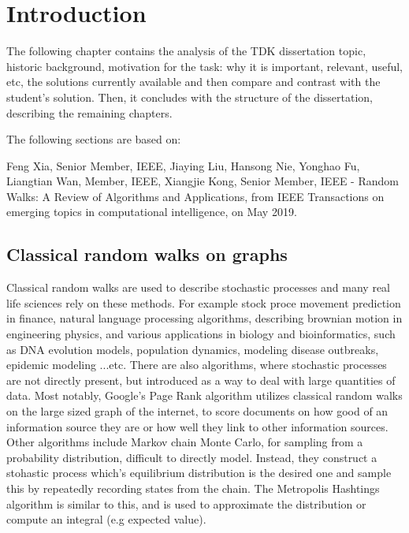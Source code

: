 \chapter{Introduction}

The following chapter contains the analysis of the TDK dissertation topic, historic background, motivation for the task: why it is important, relevant, useful, etc, the solutions currently available and then compare and contrast with the student's solution. Then, it concludes with the structure of the dissertation, describing the remaining chapters.

The following sections are based on:

Feng Xia, Senior Member, IEEE, Jiaying Liu, Hansong Nie, Yonghao Fu, Liangtian Wan, Member, IEEE,
Xiangjie Kong, Senior Member, IEEE - Random Walks: A Review of Algorithms and Applications, from IEEE Transactions on emerging topics in computational intelligence, on May 2019.

\section{Classical random walks on graphs}

Classical random walks are used to describe stochastic processes and many real life sciences rely on these methods. For example stock proce movement prediction in finance, natural language processing algorithms, describing brownian motion in engineering physics, and various applications in biology and bioinformatics, such as DNA evolution models, population dynamics, modeling disease outbreaks, epidemic modeling ...etc. There are also algorithms, where stochastic processes are not directly present, but introduced as a way to deal with large quantities of data. Most notably, Google's Page Rank algorithm utilizes classical random walks on the large sized graph of the internet, to score documents on how good of an information source they are or how well they link to other information sources. Other algorithms include Markov chain Monte Carlo, for sampling from a probability distribution, difficult to directly model. Instead, they construct a stohastic process which's equilibrium distribution is the desired one and sample this by repeatedly recording states from the chain. The Metropolis Hashtings algorithm is similar to this, and is used to approximate the distribution or compute an integral (e.g expected value).


